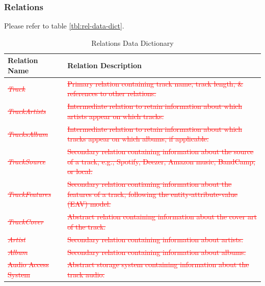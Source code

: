 \documentclass[12pt]{article}
\begin{document}
\subsubsection{Relations}
Please refer to table \ref{tbl:rel-data-dict}.
\begin{table}[h!]
  \centering
  \begin{tabular}{ p{.25\linewidth} || p{.65\linewidth} }
    \textbf{Relation Name} & \textbf{Relation Description} \\
    \toprule
    \textcolor{red}{\sout{\emph{Track}}} & \textcolor{red}{\sout{Primary relation containing track name, track length, \& references to other relations.}} \\
    \midrule
    \textcolor{red}{\sout{\emph{TrackArtists}}} & \textcolor{red}{\sout{Intermediate relation to retain information about which artists appear on which tracks.}} \\
    \midrule
    \textcolor{red}{\sout{\emph{TracksAlbum}}} & \textcolor{red}{\sout{Intermediate relation to retain information about which tracks appear on which albums, if applicable.}} \\
    \midrule
    \textcolor{red}{\sout{\emph{TrackSource}}} & \textcolor{red}{\sout{Secondary relation containing information about the source of a track, e.g., Spotify, Deezer, Amazon music, BandCamp, or local.}} \\
    \midrule
    \textcolor{red}{\sout{\emph{TrackFeatures}}} & \textcolor{red}{\sout{Secondary relation contianing information about the features of a track, following the entity-attribute-value (EAV) model.}} \\
    \midrule
    \textcolor{red}{\sout{\emph{TrackCover}}} & \textcolor{red}{\sout{Abstract relation containing information about the cover art of the track.}} \\
    \midrule
    \textcolor{red}{\sout{\emph{Artist}}} & \textcolor{red}{\sout{Secondary relation containing information about artists.}} \\
    \midrule
    \textcolor{red}{\sout{\emph{Album}}} & \textcolor{red}{\sout{Secondary relation containing information about albums.}} \\
    \midrule
    \textcolor{red}{\sout{Audio Access System}} & \textcolor{red}{\sout{Abstract storage system containing information about the track audio.}} \\
  \end{tabular}
  \label{tbl:rel-data-dict-old}
  \caption{Relations Data Dictionary}
\end{table}
\end{document}

